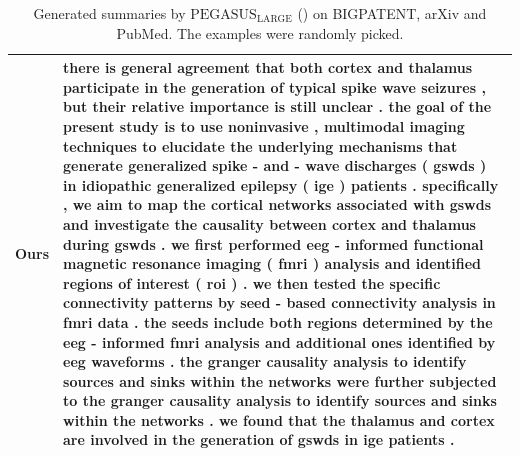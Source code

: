 \begin{table}[h!]
\begin{tabular}{c|p{}}
  Ours & there is general agreement that both cortex and thalamus participate in the generation of typical spike wave seizures , but their relative importance is still unclear . the goal of the present study is to use noninvasive , multimodal imaging techniques to elucidate the underlying mechanisms that generate generalized spike - and - wave discharges ( gswds ) in idiopathic generalized epilepsy ( ige ) patients . specifically , we aim to map the cortical networks associated with gswds and investigate the causality between cortex and thalamus during gswds . we first performed eeg - informed functional magnetic resonance imaging ( fmri ) analysis and identified regions of interest ( roi ) . we then tested the specific connectivity patterns by seed - based connectivity analysis in fmri data . the seeds include both regions determined by the eeg - informed fmri analysis and additional ones identified by eeg waveforms . the granger causality analysis to identify sources and sinks within the networks were further subjected to the granger causality analysis to identify sources and sinks within the networks . we found that the thalamus and cortex are involved in the generation of gswds in ige patients . \\\hline
  
  \end{tabular}
  \caption{Generated summaries by $\text{PEGASUS}_{\text{LARGE}}$ (\gnews) on BIGPATENT, arXiv and PubMed. The examples were randomly picked.}
  \label{tab:qualitative_3}
\end{table}



